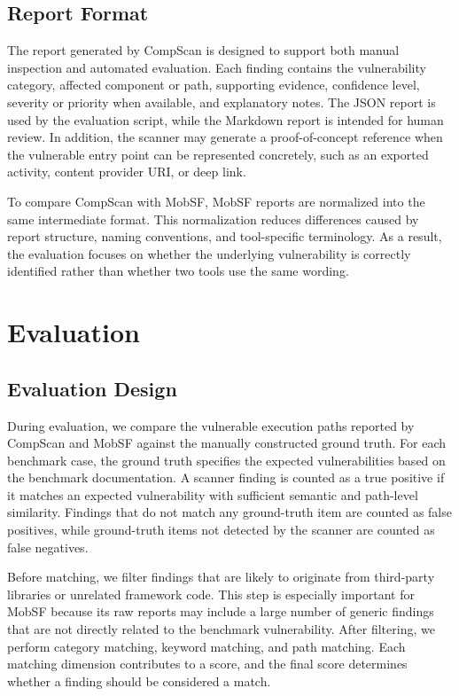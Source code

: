 \documentclass[sigconf, nonacm]{acmart}
\begin{document}
\subsection{Report Format}

The report generated by CompScan is designed to support both manual inspection and automated evaluation. Each finding contains the vulnerability category, affected component or path, supporting evidence, confidence level, severity or priority when available, and explanatory notes. The JSON report is used by the evaluation script, while the Markdown report is intended for human review. In addition, the scanner may generate a proof-of-concept reference when the vulnerable entry point can be represented concretely, such as an exported activity, content provider URI, or deep link.

To compare CompScan with MobSF, MobSF reports are normalized into the same intermediate format. This normalization reduces differences caused by report structure, naming conventions, and tool-specific terminology. As a result, the evaluation focuses on whether the underlying vulnerability is correctly identified rather than whether two tools use the same wording.

\section{Evaluation}

\subsection{Evaluation Design}

During evaluation, we compare the vulnerable execution paths reported by CompScan and MobSF against the manually constructed ground truth. For each benchmark case, the ground truth specifies the expected vulnerabilities based on the benchmark documentation. A scanner finding is counted as a true positive if it matches an expected vulnerability with sufficient semantic and path-level similarity. Findings that do not match any ground-truth item are counted as false positives, while ground-truth items not detected by the scanner are counted as false negatives.

Before matching, we filter findings that are likely to originate from third-party libraries or unrelated framework code. This step is especially important for MobSF because its raw reports may include a large number of generic findings that are not directly related to the benchmark vulnerability. After filtering, we perform category matching, keyword matching, and path matching. Each matching dimension contributes to a score, and the final score determines whether a finding should be considered a match.
\end{document}

